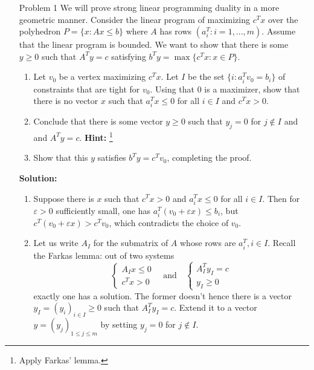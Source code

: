 \documentclass[12pt]{article}
\begin{document}




\begin{enumerate}
\item[Problem 1] We will prove strong linear programming duality in a more geometric manner.  Consider the linear program of maximizing $c^T x$ over the polyhedron $P = \{x:Ax \leq b\}$ where $A$ has rows $(a_i^T: i =1,...,m)$. Assume that the linear program is bounded. We want to show that there is some $y \geq 0$ such that $A^T y = c$ satisfying $b^T y = \max \{c^T x: x \in P\}$.
\begin{enumerate}
\item Let $v_0$ be a vertex maximizing $c^Tx$. Let $I$ be the set $\{i: a_i^T v_0 = b_i\}$ of constraints that are tight for $v_0$. Using that $0$ is a maximizer, show that there is no vector $x$ such that $a_i^T x \leq 0$ for all $i \in I$ and $c^T x > 0$.
\item Conclude that there is some vector $y \geq 0$ such that $y_j = 0$ for $j \not\in I$ and and $A^T y = c.$ \textbf{Hint: }\footnote{Apply Farkas' lemma.}
\item Show that this $y$ satisfies $b^T y = c^T v_0$, completing the proof.
\end{enumerate}

\textbf{Solution: }

\begin{enumerate}
\item Suppose there is $x$ such that $c^T x > 0$ and $a_i^T x \leq 0$ for all $i \in I$. Then for $\varepsilon >0$ sufficiently small, one has $a_i^T (v_0 +\varepsilon x) \le b_i$, but $c^T(v_0 +\varepsilon x) > c^T v_0$, which contradicts the choice of $v_0$.
    
\item Let us write $A_I$ for the submatrix of $A$ whose rows are $a_i^T, i \in I$. Recall the Farkas lemma: out of two systems
\[
\begin{cases}
  A_I x \le 0\\
  c^T x > 0
\end{cases} \quad \text{and} \quad 
\begin{cases}
  A_I^T y_I = c\\
  y_I \ge 0
\end{cases}
\]
exactly one has a solution. The former doesn't hence there is a vector $y_I = (y_i)_{i \in I} \ge 0$ such that $A_I^T y_I = c$. Extend it to a vector $y = (y_j)_{1\le j \le m}$ by setting $y_j = 0$ for $j \notin I$.


\end{enumerate}
\end{enumerate}
\end{document}
